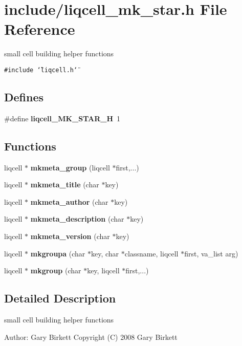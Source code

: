 \section{include/liqcell\_\-mk\_\-star.h File Reference}
\label{df/dca/liqcell__mk__star_8h}
small cell building helper functions  


{\tt \#include \char`\"{}liqcell.h\char`\"{}}\par
\subsection*{Defines}
\begin{CompactItemize}
\item 
\#define \textbf{liqcell\_\-MK\_\-STAR\_\-H}~1\label{df/dca/liqcell__mk__star_8h_55cd1927834d002c7731f2dd322fa758}

\end{CompactItemize}
\subsection*{Functions}
\begin{CompactItemize}
\item 
liqcell $\ast$ {\bf mkmeta\_\-group} (liqcell $\ast$first,...)
\item 
liqcell $\ast$ {\bf mkmeta\_\-title} (char $\ast$key)
\item 
liqcell $\ast$ {\bf mkmeta\_\-author} (char $\ast$key)
\item 
liqcell $\ast$ {\bf mkmeta\_\-description} (char $\ast$key)
\item 
liqcell $\ast$ {\bf mkmeta\_\-version} (char $\ast$key)
\item 
liqcell $\ast$ {\bf mkgroupa} (char $\ast$key, char $\ast$classname, liqcell $\ast$first, va\_\-list arg)
\item 
liqcell $\ast$ {\bf mkgroup} (char $\ast$key, liqcell $\ast$first,...)
\end{CompactItemize}


\label{_details}
\subsection{Detailed Description}
small cell building helper functions 

\begin{Desc}
\item[Author:]Gary Birkett Copyright (C) 2008 Gary Birkett\end{Desc}
